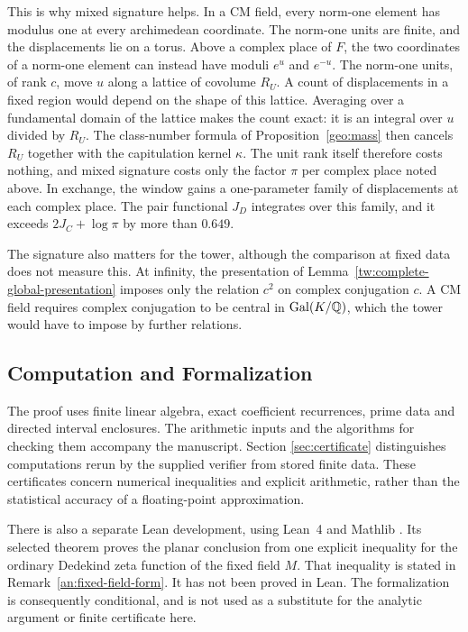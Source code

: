 This is why mixed signature helps. In a CM field, every norm-one
element has modulus one at every archimedean coordinate. The norm-one
units are finite, and the displacements lie on a torus. Above a complex
place of $F$, the two coordinates of a norm-one element can instead
have moduli $e^u$ and $e^{-u}$. The norm-one units, of rank $c$, move
$u$ along a lattice of covolume $R_U$. A count of displacements in a
fixed region would depend on the shape of this lattice. Averaging over
a fundamental domain of the lattice makes the count exact: it is an
integral over $u$ divided by $R_U$. The class-number formula of
Proposition~\ref{geo:mass} then cancels $R_U$ together with the
capitulation kernel $\kappa$. The unit rank itself therefore costs
nothing, and mixed signature costs only the factor $\pi$ per complex
place noted above. In exchange, the window gains a one-parameter family
of displacements at each complex place. The pair functional $J_D$
integrates over this family, and it exceeds $2J_C+\log\pi$ by more than
$0.649$.

The signature also matters for the tower, although the comparison at
fixed data does not measure this. At infinity, the presentation of
Lemma~\ref{tw:complete-global-presentation} imposes only the relation
$c^2$ on complex conjugation $c$. A CM field requires complex
conjugation to be central in $\operatorname{Gal}(K/\mathbb Q)$, which the tower would have
to impose by further relations.

\subsection{Computation and Formalization}

The proof uses finite linear algebra, exact coefficient recurrences,
prime data and directed interval enclosures. The arithmetic inputs
and the algorithms for checking them accompany the manuscript.
Section \ref{sec:certificate} distinguishes computations rerun by
the supplied verifier from stored finite data. These certificates
concern numerical inequalities and explicit arithmetic, rather than
the statistical accuracy of a floating-point approximation.

There is also a separate Lean development, using Lean~4 and Mathlib
\cite{Lean4_2021,Mathlib2020}. Its selected theorem proves the planar
conclusion from one explicit inequality for the ordinary Dedekind
zeta function of the fixed field $M$. That inequality is stated in
Remark~\ref{an:fixed-field-form}. It has not been proved in Lean.
The formalization is consequently conditional, and is not used as a
substitute for the analytic argument or finite certificate here.
